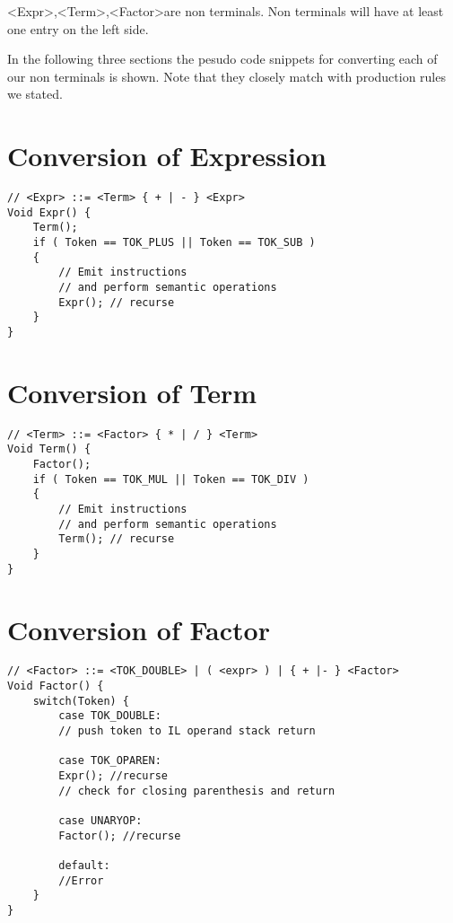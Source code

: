 \textless Expr\textgreater,\textless Term\textgreater,\textless Factor\textgreater are non terminals. Non terminals will have at least one entry on the left side. 


In the following three sections the pesudo code snippets for converting each of our non terminals is shown.
Note that they closely match with production rules we stated.
\section{Conversion of Expression}
\lstset{style=csharp}
\begin{lstlisting}
// <Expr> ::= <Term> { + | - } <Expr>
Void Expr() {
	Term();
	if ( Token == TOK_PLUS || Token == TOK_SUB )
	{
		// Emit instructions
		// and perform semantic operations
		Expr(); // recurse
	}
}
\end{lstlisting}

\section{Conversion of Term}
\lstset{style=csharp}
\begin{lstlisting}
// <Term> ::= <Factor> { * | / } <Term>
Void Term() {
	Factor();
	if ( Token == TOK_MUL || Token == TOK_DIV )
	{
		// Emit instructions
		// and perform semantic operations
		Term(); // recurse
	}
}
\end{lstlisting}

\section{Conversion of Factor}
\lstset{style=csharp}
\begin{lstlisting}
// <Factor> ::= <TOK_DOUBLE> | ( <expr> ) | { + |- } <Factor>
Void Factor() {
	switch(Token) {
		case TOK_DOUBLE:
		// push token to IL operand stack return
		
		case TOK_OPAREN:
		Expr(); //recurse
		// check for closing parenthesis and return

		case UNARYOP:
		Factor(); //recurse
		
		default:
		//Error
	}
}
\end{lstlisting}
